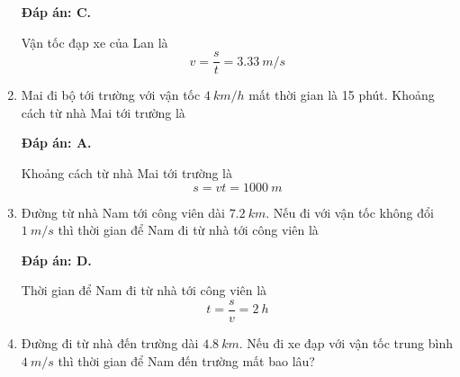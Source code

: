 \begin{enumerate}[label=\bfseries Câu \arabic*:]
	\hideall
	{\textbf{Đáp án: C.}
		
		Vận tốc đạp xe của Lan là
		$$v=\dfrac{s}{t} = \SI{3.33}{m/s}$$
	}
	\item {}
	
	
	{Mai đi bộ tới trường với vận tốc $\SI{4}{km/h}$ mất thời gian là 15 phút. Khoảng cách từ nhà Mai tới trường là
		
		
	}
	
	\hideall
	{\textbf{Đáp án: A.}
		
		Khoảng cách từ nhà Mai tới trường là
		$$s=vt=\SI{1000}{m}$$
	}
	\item {}
	
	
	{Đường từ nhà Nam tới công viên dài $\SI{7.2}{km}$. Nếu đi với vận tốc không đổi $\SI{1}{m/s}$ thì thời gian để Nam đi từ nhà tới công viên là
		
		
	}
	
	\hideall
	{\textbf{Đáp án: D.}
		
		Thời gian để Nam đi từ nhà tới công viên là
		$$t=\dfrac{s}{v} = \SI{2}{h}$$
	}
	\item {}
	
	
	{Đường đi từ nhà đến trường dài $\SI{4.8}{km}$. Nếu đi xe đạp với vận tốc trung bình $\SI{4}{m/s}$ thì thời gian để Nam đến trường mất bao lâu?
		
		
	}
	

\end{enumerate}
